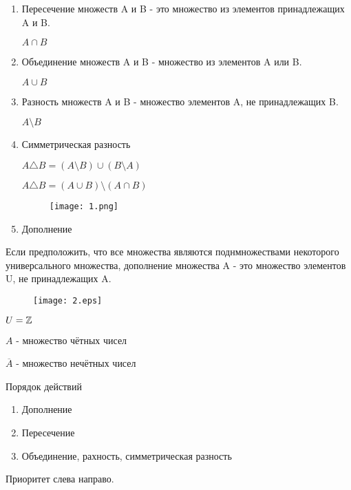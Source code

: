 \begin{enumerate}
    \item Пересечение множеств A и B - это множество из элементов принадлежащих A и B.
    \begin{notation}
        $A \cap B$
    \end{notation}
    \item Объединение множеств A и B - множество из элементов A или B.
    \begin{notation}
        $A \cup B$
    \end{notation}
    \item Разность множеств A и B - множество элементов A, не принадлежащих B.
    \begin{notation}
        $A \setminus B$
    \end{notation}
    \item Симметрическая разность
    \begin{eg}
        $A \triangle B = (A \setminus B) \cup (B \setminus A)$


        $A \triangle B = (A \cup B) \setminus (A \cap B)$
    \end{eg}
    \begin{figure}[H]
        \centering
        \texttt{[image: 1.png]}
        
        
        \label{fig:1}
    \end{figure}
    
    \item Дополнение
    
\end{enumerate}

Если предположить, что все множества являются поднмножествами некоторого универсального множества, дополнение множества A - это множество элементов U, не принадлежащих A.

\begin{figure}[H]
    \centering
    \texttt{[image: 2.eps]}
    
    
    \label{fig:2}
\end{figure}

\begin{eg}
$U = \mathbb{Z}$

$A$ - множество чётных чисел

$\overline A$ - множество нечётных чисел
\end{eg}

Порядок действий
\begin{enumerate}
    \item Дополнение
    \item Пересечение
    \item Объединение, рахность, симметрическая разность
\end{enumerate}
Приоритет слева направо.

